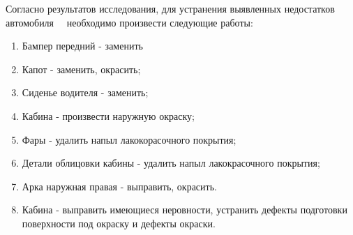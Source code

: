 {Согласно результатов исследования, для устранения выявленных недостатков автомобиля \,  \, необходимо произвести следующие работы:

\begin{enumerate}
	\item Бампер передний - заменить
	\item Капот - заменить, окрасить;
	\item Сиденье водителя - заменить;
	\item Кабина - произвести наружную окраску;
	\item Фары - удалить напыл лакокорасочного покрытия;
	\item Детали облицовки кабины - удалить напыл лакокрасочного покрытия;
	\item Арка наружная правая - выправить, окрасить.
	\item Кабина - выправить имеющиеся неровности, устранить дефекты подготовки поверхности под окраску и дефекты окраски.
\end{enumerate}


}
